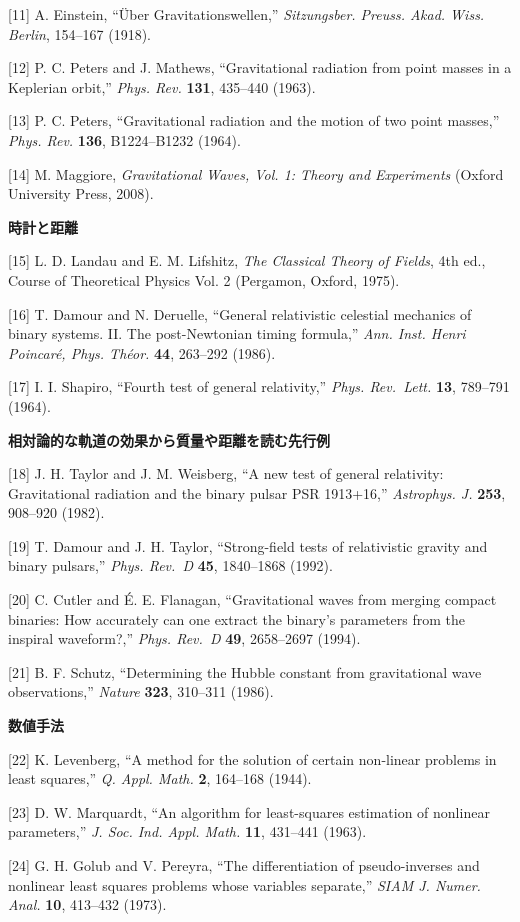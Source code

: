 \documentclass[
  a4paper,
]{ltjsarticle}
\begin{document}
{[}11{]} A. Einstein, ``Über Gravitationswellen,'' \emph{Sitzungsber.
Preuss. Akad. Wiss. Berlin}, 154--167 (1918).

{[}12{]} P. C. Peters and J. Mathews, ``Gravitational radiation from
point masses in a Keplerian orbit,'' \emph{Phys. Rev.} \textbf{131},
435--440 (1963).

{[}13{]} P. C. Peters, ``Gravitational radiation and the motion of two
point masses,'' \emph{Phys. Rev.} \textbf{136}, B1224--B1232 (1964).

{[}14{]} M. Maggiore, \emph{Gravitational Waves, Vol. 1: Theory and
Experiments} (Oxford University Press, 2008).

\textbf{時計と距離}

{[}15{]} L. D. Landau and E. M. Lifshitz, \emph{The Classical Theory of
Fields}, 4th ed., Course of Theoretical Physics Vol. 2 (Pergamon,
Oxford, 1975).

{[}16{]} T. Damour and N. Deruelle, ``General relativistic celestial
mechanics of binary systems. II. The post-Newtonian timing formula,''
\emph{Ann. Inst. Henri Poincaré, Phys. Théor.} \textbf{44}, 263--292
(1986).

{[}17{]} I. I. Shapiro, ``Fourth test of general relativity,''
\emph{Phys. Rev.~Lett.} \textbf{13}, 789--791 (1964).

\textbf{相対論的な軌道の効果から質量や距離を読む先行例}

{[}18{]} J. H. Taylor and J. M. Weisberg, ``A new test of general
relativity: Gravitational radiation and the binary pulsar PSR 1913+16,''
\emph{Astrophys. J.} \textbf{253}, 908--920 (1982).

{[}19{]} T. Damour and J. H. Taylor, ``Strong-field tests of
relativistic gravity and binary pulsars,'' \emph{Phys. Rev.~D}
\textbf{45}, 1840--1868 (1992).

{[}20{]} C. Cutler and É. E. Flanagan, ``Gravitational waves from
merging compact binaries: How accurately can one extract the binary's
parameters from the inspiral waveform?,'' \emph{Phys. Rev.~D}
\textbf{49}, 2658--2697 (1994).

{[}21{]} B. F. Schutz, ``Determining the Hubble constant from
gravitational wave observations,'' \emph{Nature} \textbf{323}, 310--311
(1986).

\textbf{数値手法}

{[}22{]} K. Levenberg, ``A method for the solution of certain non-linear
problems in least squares,'' \emph{Q. Appl. Math.} \textbf{2}, 164--168
(1944).

{[}23{]} D. W. Marquardt, ``An algorithm for least-squares estimation of
nonlinear parameters,'' \emph{J. Soc. Ind. Appl. Math.} \textbf{11},
431--441 (1963).

{[}24{]} G. H. Golub and V. Pereyra, ``The differentiation of
pseudo-inverses and nonlinear least squares problems whose variables
separate,'' \emph{SIAM J. Numer. Anal.} \textbf{10}, 413--432 (1973).
\end{document}
